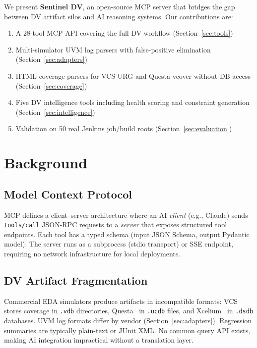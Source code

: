 \documentclass[10pt,twocolumn]{article}
\begin{document}
We present \textbf{Sentinel DV}, an open-source MCP server that bridges the gap
between DV artifact silos and AI reasoning systems. Our contributions are:
\begin{enumerate}
  \item A 28-tool MCP API covering the full DV workflow (Section~\ref{sec:tools})
  \item Multi-simulator UVM log parsers with false-positive elimination (Section~\ref{sec:adapters})
  \item HTML coverage parsers for VCS URG and Questa vcover without DB access (Section~\ref{sec:coverage})
  \item Five DV intelligence tools including health scoring and constraint generation (Section~\ref{sec:intelligence})
  \item Validation on 50 real Jenkins job/build roots (Section~\ref{sec:evaluation})
\end{enumerate}

\section{Background}

\subsection{Model Context Protocol}
MCP defines a client--server architecture where an AI \emph{client} (e.g., Claude)
sends \texttt{tools/call} JSON-RPC requests to a \emph{server} that exposes
structured tool endpoints. Each tool has a typed schema (input JSON Schema,
output Pydantic model). The server runs as a subprocess (stdio transport) or
SSE endpoint, requiring no network infrastructure for local deployments.

\subsection{DV Artifact Fragmentation}
Commercial EDA simulators produce artifacts in incompatible formats:
VCS~\cite{vcs} stores coverage in \texttt{.vdb} directories, Questa~\cite{questa}
in \texttt{.ucdb} files, and Xcelium~\cite{xcelium} in \texttt{.dsdb} databases.
UVM log formats differ by vendor (Section~\ref{sec:adapters}). Regression summaries
are typically plain-text or JUnit XML. No common query API exists, making
AI integration impractical without a translation layer.
\end{document}
